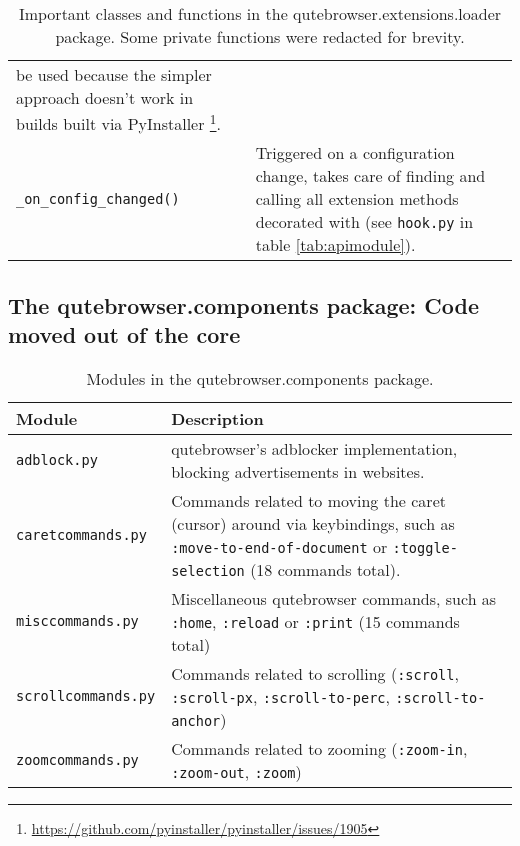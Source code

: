 \begin{table}[H]
\begin{tabulary}{\linewidth}{lL}
                               be used because the simpler approach doesn't work
                               in builds built via
                               PyInstaller
                               \footnote{\url{https://github.com/pyinstaller/pyinstaller/issues/1905}}. \\
    \verb|_on_config_changed()| & Triggered on a configuration change, takes
                                  care of finding and calling all extension
                                  methods decorated with
                                   (see
                                  \verb|hook.py| in table \ref{tab:apimodule}). \\
    \bottomrule
  \end{tabulary}
  \caption[Important classes and functions in the qutebrowser.extensions.loader
  package.]{Important classes and functions in the qutebrowser.extensions.loader package.
    Some private functions were redacted for brevity.}
\end{table}

\subsection[The qutebrowser.components package]{The qutebrowser.components
  package: Code moved out of the core}
\label{sec:components}

\begin{table}[H]
  \centering
  \begin{tabulary}{\linewidth}{lL}
    \toprule
    Module & Description \\
    \midrule
    \verb|adblock.py| & qutebrowser's adblocker implementation, blocking
                         advertisements in websites. \\
    \verb|caretcommands.py| & Commands related to moving the caret
                              (cursor) around via keybindings, such as
                              \verb|:move-to-end-of-document| or
                              \verb|:toggle-selection| (18 commands total). \\
    \verb|misccommands.py| & Miscellaneous qutebrowser commands, such as
                             \verb|:home|, \verb|:reload| or \verb|:print| (15
                             commands total) \\
    \verb|scrollcommands.py| & Commands related to scrolling (\verb|:scroll|,
                               \verb|:scroll-px|, \verb|:scroll-to-perc|,
                               \verb|:scroll-to-anchor|) \\
    \verb|zoomcommands.py| & Commands related to zooming (\verb|:zoom-in|,
                             \verb|:zoom-out|, \verb|:zoom|) \\
    \bottomrule
  \end{tabulary}
  \caption{Modules in the qutebrowser.components package.}
\end{table}


